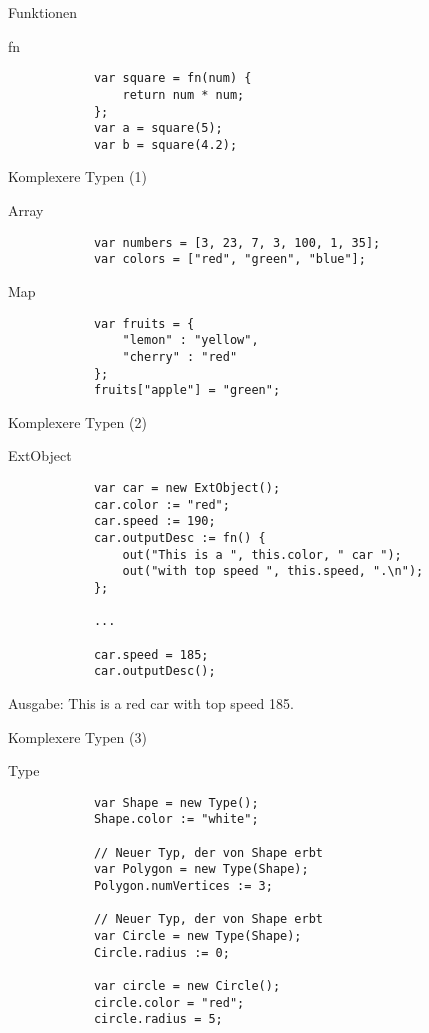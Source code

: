 \documentclass[ucs,9pt]{beamer}
\begin{document}
\begin{frame}[fragile]{Funktionen}
	\begin{block}{fn}
		\begin{lstlisting}
			var square = fn(num) {
			    return num * num;
			};
			var a = square(5);
			var b = square(4.2);
		\end{lstlisting}
	\end{block}
\end{frame}

\begin{frame}[fragile]{Komplexere Typen (1)}
	\begin{block}{Array}
		\begin{lstlisting}
			var numbers = [3, 23, 7, 3, 100, 1, 35];
			var colors = ["red", "green", "blue"];
		\end{lstlisting}
	\end{block}
	\begin{block}{Map}
		\begin{lstlisting}
			var fruits = {
			    "lemon" : "yellow",
			    "cherry" : "red"
			};
			fruits["apple"] = "green";
		\end{lstlisting}
	\end{block}
\end{frame}

\begin{frame}[fragile]{Komplexere Typen (2)}
	\begin{block}{ExtObject}
		\begin{lstlisting}
			var car = new ExtObject();
			car.color := "red";
			car.speed := 190;
			car.outputDesc := fn() {
			    out("This is a ", this.color, " car ");
			    out("with top speed ", this.speed, ".\n");
			};

			...

			car.speed = 185;
			car.outputDesc();
		\end{lstlisting}
	\end{block}
	Ausgabe: This is a red car with top speed 185.
\end{frame}

\begin{frame}[fragile]{Komplexere Typen (3)}
	\begin{block}{Type}
		\begin{lstlisting}
			var Shape = new Type();
			Shape.color := "white";

			// Neuer Typ, der von Shape erbt
			var Polygon = new Type(Shape); 
			Polygon.numVertices := 3;

			// Neuer Typ, der von Shape erbt
			var Circle = new Type(Shape); 
			Circle.radius := 0;

			var circle = new Circle();
			circle.color = "red";
			circle.radius = 5;
		\end{lstlisting}
	\end{block}
\end{frame}
 
\end{document}
